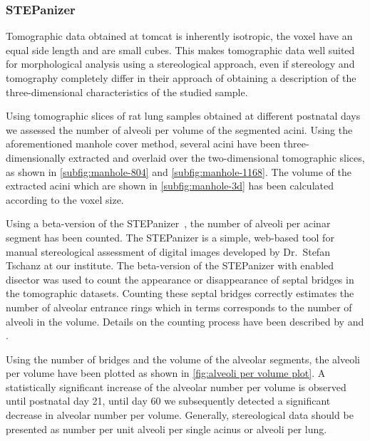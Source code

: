\subsubsection{STEPanizer}\label{sec:stepanizer}
Tomographic data obtained at \ac{tomcat} is inherently isotropic, \ie the voxel have an equal side length and are small cubes. This makes tomographic data well suited for morphological analysis using a stereological approach, even if stereology and tomography completely differ in their approach of obtaining a description of the three-dimensional characteristics of the studied sample.

Using tomographic slices of rat lung samples obtained at different postnatal days we assessed the number of alveoli per volume of the segmented acini. Using the aforementioned manhole cover method, several acini have been three-dimensionally extracted and overlaid over the two-dimensional tomographic slices, as shown in \autoref{subfig:manhole-804} and \ref{subfig:manhole-1168}. The volume of the extracted acini which are shown in \autoref{subfig:manhole-3d} has been calculated according to the voxel size.

Using a beta-version of the STEPanizer~\cite[available \href{http://stepanizer.com/}{online}]{Tschanz2010}, the number of alveoli per acinar segment has been counted. The STEPanizer is a simple, web-based tool for manual stereological assessment of digital images developed by Dr.\ Stefan Tschanz at our institute. The beta-version of the STEPanizer with enabled disector was used to count the appearance or disappearance of septal bridges in the tomographic datasets. Counting these septal bridges correctly estimates the number of alveolar entrance rings which in terms corresponds to the number of alveoli in the volume. Details on the counting process have been described by \citet{Hyde2004} and \citet{Ochs2004}.

Using the number of bridges and the volume of the alveolar segments, the alveoli per volume have been plotted as shown in \autoref{fig:alveoli per volume plot}. A statistically significant increase of the alveolar number per volume is observed until postnatal day 21,  until day 60 we subsequently detected a significant decrease in alveolar number per volume. Generally, stereological data should be presented as number per unit \eg alveoli per single acinus or alveoli per lung.

